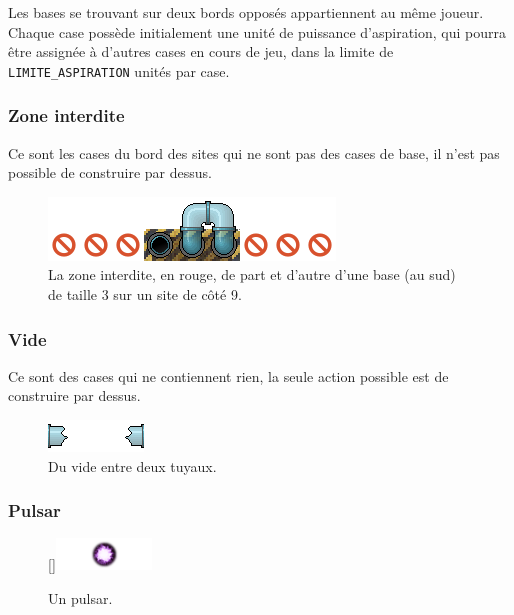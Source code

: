 Les bases se trouvant sur deux bords opposés appartiennent au même
joueur. Chaque case possède initialement une unité de puissance
d'aspiration, qui pourra être assignée à d'autres cases en cours de jeu,
dans la limite de \texttt{LIMITE\_ASPIRATION} unités par case.

\subsubsection{Zone interdite}\label{zone-interdite}

Ce sont les cases du bord des sites qui ne sont pas des cases de base,
il n'est pas possible de construire par dessus.

\begin{figure}[!h]
    \centering
    \includegraphics{asset/interdit.png}
    \caption*{La zone interdite, en rouge, de part et d'autre d'une base (au sud) de taille 3 sur un site de côté 9.}
\end{figure}

\subsubsection{Vide}\label{vide}

Ce sont des cases qui ne contiennent rien, la seule action possible est
de construire par dessus.

\begin{figure}[!h]
    \centering
    \includegraphics{asset/vide.png}
    \caption*{Du vide entre deux tuyaux.}
\end{figure}

\subsubsection{Pulsar}\label{pulsar}

\begin{figure}
    \centering
    \raisebox{0pt}[\dimexpr{}\baselineskip\relax]{\includegraphics{asset/pulsar.png}}
    \caption*{Un pulsar.}
\end{figure}

